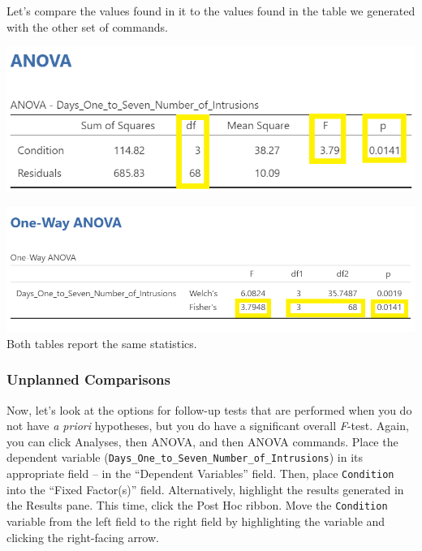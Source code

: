 \documentclass[
]{book}
\begin{document}
Let's compare the values found in it to the values found in the table we generated with the other set of commands.

\includegraphics{img/ANOVAResultsANOVATable_StatsHighlighted.png}

\includegraphics{img/OneWayANOVAResultsANOVATable_StatsHighlighted.png}
Both tables report the same statistics.

\hypertarget{unplanned-comparisons-1}{%
\subsubsection{Unplanned Comparisons}\label{unplanned-comparisons-1}}

Now, let's look at the options for follow-up tests that are performed when you do not have \emph{a priori} hypotheses, but you do have a significant overall \emph{F}-test. Again, you can click {Analyses}, then {ANOVA}, and then {ANOVA} commands. Place the dependent variable (\texttt{Days\_One\_to\_Seven\_Number\_of\_Intrusions}) in its appropriate field -- in the ``Dependent Variables'' field. Then, place \texttt{Condition} into the ``Fixed Factor(s)'' field. Alternatively, highlight the results generated in the Results pane.
This time, click the {Post Hoc} ribbon. Move the \texttt{Condition} variable from the left field to the right field by highlighting the variable and clicking the right-facing arrow.
\end{document}

